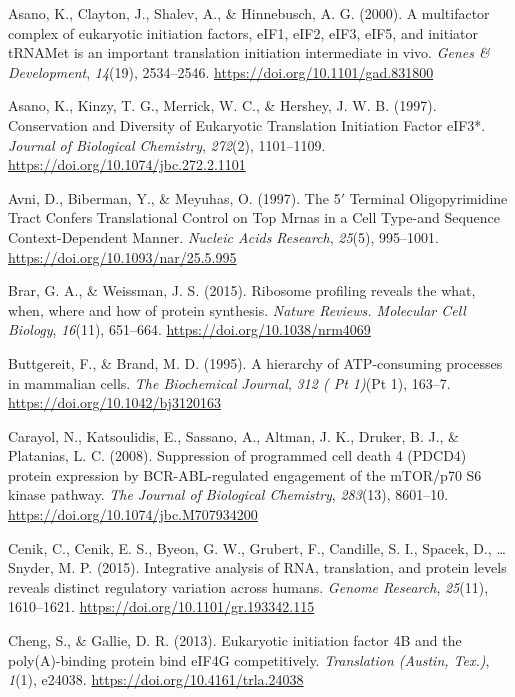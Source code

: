 \documentclass[12pt,openany]{book}
\begin{document}
\hypertarget{ref-Asano2000}{}
Asano, K., Clayton, J., Shalev, A., \& Hinnebusch, A. G. (2000). A
multifactor complex of eukaryotic initiation factors, eIF1, eIF2, eIF3,
eIF5, and initiator tRNAMet is an important translation initiation
intermediate in vivo. \emph{Genes \& Development}, \emph{14}(19),
2534--2546. \url{https://doi.org/10.1101/gad.831800}

\hypertarget{ref-Asano1997}{}
Asano, K., Kinzy, T. G., Merrick, W. C., \& Hershey, J. W. B. (1997).
Conservation and Diversity of Eukaryotic Translation Initiation Factor
eIF3*. \emph{Journal of Biological Chemistry}, \emph{272}(2),
1101--1109. \url{https://doi.org/10.1074/jbc.272.2.1101}

\hypertarget{ref-Avni1997}{}
Avni, D., Biberman, Y., \& Meyuhas, O. (1997). The 5\({'}\) Terminal
Oligopyrimidine Tract Confers Translational Control on Top Mrnas in a
Cell Type-and Sequence Context-Dependent Manner. \emph{Nucleic Acids
Research}, \emph{25}(5), 995--1001.
\url{https://doi.org/10.1093/nar/25.5.995}

\hypertarget{ref-Brar2015}{}
Brar, G. A., \& Weissman, J. S. (2015). Ribosome profiling reveals the
what, when, where and how of protein synthesis. \emph{Nature Reviews.
Molecular Cell Biology}, \emph{16}(11), 651--664.
\url{https://doi.org/10.1038/nrm4069}

\hypertarget{ref-Buttgereit1995}{}
Buttgereit, F., \& Brand, M. D. (1995). A hierarchy of ATP-consuming
processes in mammalian cells. \emph{The Biochemical Journal}, \emph{312
( Pt 1)}(Pt 1), 163--7. \url{https://doi.org/10.1042/bj3120163}

\hypertarget{ref-Carayol2008}{}
Carayol, N., Katsoulidis, E., Sassano, A., Altman, J. K., Druker, B. J.,
\& Platanias, L. C. (2008). Suppression of programmed cell death 4
(PDCD4) protein expression by BCR-ABL-regulated engagement of the
mTOR/p70 S6 kinase pathway. \emph{The Journal of Biological Chemistry},
\emph{283}(13), 8601--10. \url{https://doi.org/10.1074/jbc.M707934200}

\hypertarget{ref-Cenik2015}{}
Cenik, C., Cenik, E. S., Byeon, G. W., Grubert, F., Candille, S. I.,
Spacek, D., \ldots{} Snyder, M. P. (2015). Integrative analysis of RNA,
translation, and protein levels reveals distinct regulatory variation
across humans. \emph{Genome Research}, \emph{25}(11), 1610--1621.
\url{https://doi.org/10.1101/gr.193342.115}

\hypertarget{ref-Cheng2013}{}
Cheng, S., \& Gallie, D. R. (2013). Eukaryotic initiation factor 4B and
the poly(A)-binding protein bind eIF4G competitively. \emph{Translation
(Austin, Tex.)}, \emph{1}(1), e24038.
\url{https://doi.org/10.4161/trla.24038}
\end{document}
